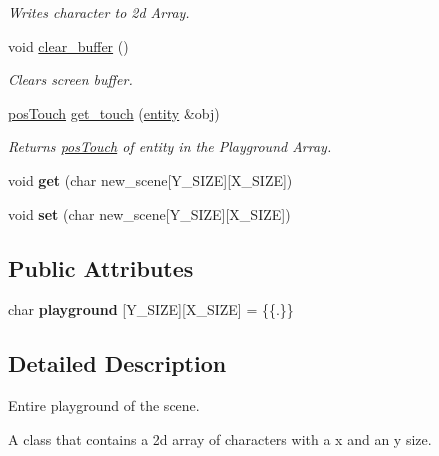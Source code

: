 \begin{DoxyCompactItemize}
\begin{DoxyCompactList}\small\item\em Writes character to 2d Array. \end{DoxyCompactList}\item 
void \hyperlink{classfield_a5a46a87df8d359135e5dabd900a92546}{clear\+\_\+buffer} ()
\begin{DoxyCompactList}\small\item\em Clears screen buffer. \end{DoxyCompactList}\item 
\hyperlink{classposTouch}{pos\+Touch} \hyperlink{classfield_a272e79e7579f8485f9d082629fd23eae}{get\+\_\+touch} (\hyperlink{classentity}{entity} \&obj)
\begin{DoxyCompactList}\small\item\em Returns \hyperlink{classposTouch}{pos\+Touch} of entity in the Playground Array. \end{DoxyCompactList}\item 
\mbox{\label{classfield_a27393334b27b02ba0d6ce08c7104291f}} 
void {\bfseries get} (char new\+\_\+scene\mbox{[}Y\+\_\+\+S\+I\+ZE\mbox{]}\mbox{[}X\+\_\+\+S\+I\+ZE\mbox{]})
\item 
\mbox{\label{classfield_a529a3a3c6fe009ffdf5356973b3cca13}} 
void {\bfseries set} (char new\+\_\+scene\mbox{[}Y\+\_\+\+S\+I\+ZE\mbox{]}\mbox{[}X\+\_\+\+S\+I\+ZE\mbox{]})
\end{DoxyCompactItemize}
\subsection*{Public Attributes}
\begin{DoxyCompactItemize}
\item 
\mbox{\label{classfield_a26c28b0180722e9a76dd3ee8b3ef3c95}} 
char {\bfseries playground} \mbox{[}Y\+\_\+\+S\+I\+ZE\mbox{]}\mbox{[}X\+\_\+\+S\+I\+ZE\mbox{]} = \{\{\textquotesingle{}.\textquotesingle{}\}\}
\end{DoxyCompactItemize}


\subsection{Detailed Description}
Entire playground of the scene. 

A class that contains a 2d array of characters with a x and an y size. 

